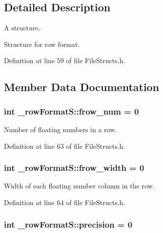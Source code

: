 \subsection{Detailed Description}
A structure. 

Structure for row format. 

Definition at line 59 of file File\+Structs.\+h.



\subsection{Member Data Documentation}
\subsubsection[{\texorpdfstring{frow\+\_\+num}{frow_num}}]{\setlength{\rightskip}{0pt plus 5cm}int \+\_\+row\+Format\+S\+::frow\+\_\+num = 0}\hypertarget{struct__row_format_s_a5a9d061cbfd29e54026f22a6577b1c51}{}\label{struct__row_format_s_a5a9d061cbfd29e54026f22a6577b1c51}


Number of floating numbers in a row. 



Definition at line 63 of file File\+Structs.\+h.

\subsubsection[{\texorpdfstring{frow\+\_\+width}{frow_width}}]{\setlength{\rightskip}{0pt plus 5cm}int \+\_\+row\+Format\+S\+::frow\+\_\+width = 0}\hypertarget{struct__row_format_s_ad8290b8370984dfd0fe1d47329415e57}{}\label{struct__row_format_s_ad8290b8370984dfd0fe1d47329415e57}


Width of each floating number column in the row. 



Definition at line 64 of file File\+Structs.\+h.

\subsubsection[{\texorpdfstring{precision}{precision}}]{\setlength{\rightskip}{0pt plus 5cm}int \+\_\+row\+Format\+S\+::precision = 0}\hypertarget{struct__row_format_s_afd1ddfa4acdc5ea24e031d38ec6dbc77}{}\label{struct__row_format_s_afd1ddfa4acdc5ea24e031d38ec6dbc77}


